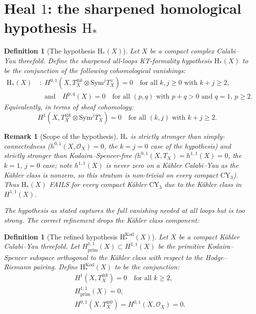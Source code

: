 \documentclass[11pt]{article}
\newtheorem{definition}[theorem]{Definition}
\newtheorem{remark}[theorem]{Remark}
\providecommand{\CY}{\mathrm{CY}}
\providecommand{\Sym}{\mathrm{Sym}}
\providecommand{\cO}{\mathcal{O}}
\begin{document}
\section{Heal $1$: the sharpened homological hypothesis $\mathrm{H}_*$}
\label{sec:heal-1-h-star}

\begin{definition}[The hypothesis $\mathrm{H}_*(X)$]
\label{def:h-star}
\ClaimStatusDefinitional
Let $X$ be a compact complex Calabi--Yau threefold.  Define the
sharpened \emph{all-loops KT-formality hypothesis} $\mathrm{H}_*(X)$
to be the conjunction of the following cohomological vanishings:
\begin{align*}
  \mathrm{H}_*(X) &\;:\;
  H^{0,1}(X, T_X^{\otimes k} \otimes \Sym^j T_X^\vee) = 0
  \quad \text{for all $k, j \geq 0$ with $k + j \geq 2$,}
  \\
  &\quad \text{and}\quad
  H^{p,q}(X) = 0 \quad \text{for all $(p,q)$ with $p+q > 0$ and $q = 1$, $p \geq 2$.}
\end{align*}
Equivalently, in terms of sheaf cohomology:
\[
  H^1(X, T_X^{\otimes k} \otimes \Sym^j T_X^\vee) = 0
  \quad \text{for all $(k, j)$ with $k + j \geq 2$.}
\]
\end{definition}

\begin{remark}[Scope of the hypothesis]
\label{rem:scope-h-star}
$\mathrm{H}_*$ is strictly stronger than simply-connectedness
($h^{0,1}(X, \cO_X) = 0$, the $k = j = 0$ case of the hypothesis)
and strictly stronger than Kodaira--Spencer-free
($h^{0,1}(X, T_X) = h^{1,1}(X) = 0$, the $k = 1$, $j = 0$ case;
note $h^{1,1}(X)$ is never zero on a K\"ahler Calabi--Yau as the
K\"ahler class is nonzero, so this stratum is non-trivial on every
compact $\CY_3$).  Thus $\mathrm{H}_*(X)$ FAILS for every
compact K\"ahler $\CY_3$ due to the K\"ahler class in $H^{1,1}(X)$.

The hypothesis as stated captures the full vanishing needed at all
loops but is too strong.  The correct refinement drops the K\"ahler
class component:
\end{remark}

\begin{definition}[The refined hypothesis $\mathrm{H}_*^{\mathrm{Kod}}(X)$]
\label{def:h-star-kod}
\ClaimStatusDefinitional
Let $X$ be a compact K\"ahler Calabi--Yau threefold.  Let
$H^{1,1}_{\mathrm{prim}}(X) \subset H^{1,1}(X)$ be the primitive
Kodaira--Spencer subspace orthogonal to the K\"ahler class with
respect to the Hodge--Riemann pairing.  Define
\emph{$\mathrm{H}_*^{\mathrm{Kod}}(X)$} to be the conjunction:
\begin{align*}
  &H^1(X, T_X^{\otimes k}) = 0 \quad \text{for all $k \geq 2$,}\\
  &H^{1,1}_{\mathrm{prim}}(X) = 0,\\
  &H^{0,1}(X, T_X^{\otimes 0}) = H^{0,1}(X, \cO_X) = 0.
\end{align*}
\end{definition}
\end{document}
